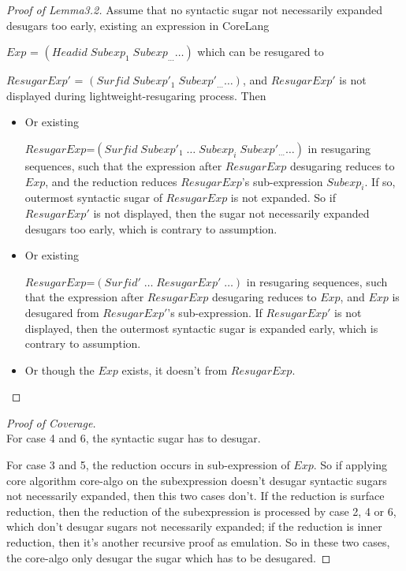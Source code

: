 \begin{proof}[Proof of Lemma3.2]
Assume that no syntactic sugar not necessarily expanded desugars too early, existing an expression in CoreLang

$Exp$ = $(Headid\;Subexp_{1}\;Subexp_{\ldots} \ldots)$ which can be resugared to

$ResugarExp'$ = $(Surfid\;Subexp'_{1}\;Subexp'_{\ldots}\ldots)$, and $ResugarExp'$ is not displayed during lightweight-resugaring process. Then

\begin{itemize}
	\item Or existing

	$ResugarExp$=$(Surfid\;Subexp'_{1}\;\ldots\;Subexp_{i}\;Subexp'_{\ldots}\ldots)$ in resugaring sequences, such that the expression after $ResugarExp$ desugaring reduces to $Exp$, and the reduction reduces $ResugarExp$'s sub-expression $Subexp_{i}$. If so, outermost syntactic sugar of $ResugarExp$ is not expanded. So if $ResugarExp'$ is not displayed, then the sugar not necessarily expanded desugars too early, which is contrary to assumption.


	\item Or existing

	$ResugarExp$=$(Surfid'\;\ldots\;ResugarExp'\;\ldots)$ in resugaring sequences, such that the expression after $ResugarExp$ desugaring reduces to $Exp$, and $Exp$ is desugared from $ResugarExp'$'s sub-expression. If $ResugarExp'$ is not displayed, then the outermost syntactic sugar is expanded early, which is contrary to assumption.
	\item Or though the $Exp$ exists, it doesn't from $ResugarExp$.

\end{itemize}
\end{proof}

\begin{proof}[Proof of Coverage]
\hfill\\
For case 4 and 6, the syntactic sugar has to desugar.

For case 3 and 5, the reduction occurs in sub-expression of $Exp$. So if applying core algorithm core-algo on the subexpression doesn't desugar syntactic sugars not necessarily expanded, then this two cases don't. If the reduction is surface reduction, then the reduction of the subexpression is processed by case 2, 4 or 6, which don't desugar sugars not necessarily expanded; if the reduction is inner reduction, then it's another recursive proof as emulation. So in these two cases, the core-algo only desugar the sugar which has to be desugared.
\end{proof}

